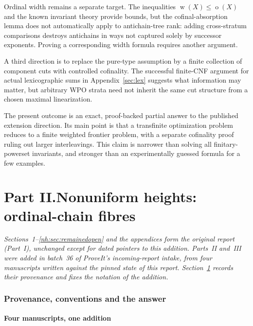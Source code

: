 \documentclass[11pt,a4paper]{article}
\theoremstyle{definition}
\theoremstyle{remark}
\newcommand{\ot}{\operatorname{o}}
\newcommand{\wid}{\operatorname{w}}
\begin{document}
Ordinal width remains a separate target. The inequalities
$\wid(X)\le\ot(X)$ and the known invariant theory provide bounds, but the
cofinal-absorption lemma does not automatically apply to antichain-tree
rank: adding cross-stratum comparisons destroys antichains in ways not
captured solely by successor exponents. Proving a corresponding width
formula requires another argument.

A third direction is to replace the pure-type assumption by a finite
collection of component cuts with controlled cofinality. The successful
finite-CNF argument for actual lexicographic sums in
Appendix~\ref{sec:lex} suggests what information may matter, but arbitrary
WPO strata need not inherit the same cut structure from a chosen maximal
linearization.

The present outcome is an exact, proof-backed partial answer to the
published extension direction. Its main point is that a transfinite
optimization problem reduces to a finite weighted frontier problem, with
a separate cofinality proof ruling out larger interleavings. This claim
is narrower than solving all finitary-powerset invariants, and stronger
than an experimentally guessed formula for a few examples.

\clearpage
{}\part*{Part II.\quad Nonuniform heights: ordinal-chain fibres}

\noindent\emph{Sections~1--\ref{nh:sec:remainedopen} and the appendices
form the original report (Part~I), unchanged except for dated pointers to this addition.
Parts~II and~III were added in batch~36 of ProveIt's incoming-report
intake, from four manuscripts written against the pinned state of this
report. Section~\ref{nh:sec:intro} records their provenance and fixes the
notation of the addition.}

\section{Provenance, conventions and the answer}\label{nh:sec:intro}

\subsection{Four manuscripts, one addition}\label{nh:sec:sources}
\end{document}
